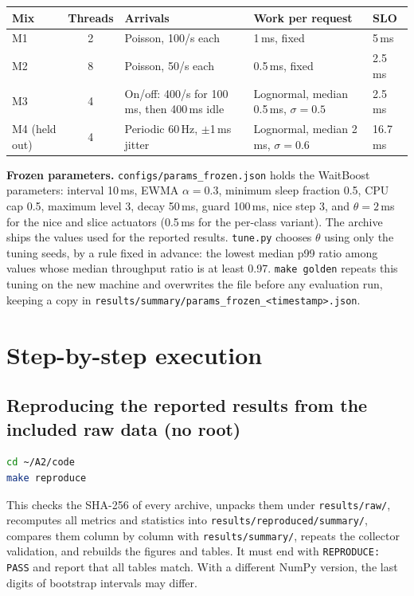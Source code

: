 \documentclass[10.5pt,a4paper]{article}
\newcommand{\f}[1]{\texttt{#1}}
\begin{document}
\begin{center}
\begin{tabularx}{\textwidth}{@{}l c L L l@{}}
\toprule
\textbf{Mix} & \textbf{Threads} & \textbf{Arrivals} & \textbf{Work per request} & \textbf{SLO} \\
\midrule
M1 & 2 & Poisson, 100/s each & 1\,ms, fixed & 5\,ms \\
M2 & 8 & Poisson, 50/s each & 0.5\,ms, fixed & 2.5\,ms \\
M3 & 4 & On/off: 400/s for 100\,ms, then 400\,ms idle & Lognormal, median 0.5\,ms, $\sigma=0.5$ & 2.5\,ms \\
M4 (held out) & 4 & Periodic 60\,Hz, $\pm$1\,ms jitter & Lognormal, median 2\,ms, $\sigma=0.6$ & 16.7\,ms \\
\bottomrule
\end{tabularx}
\end{center}

\textbf{Frozen parameters.} \f{configs/params\_frozen.json} holds the WaitBoost parameters: interval 10\,ms, EWMA $\alpha=0.3$, minimum sleep fraction 0.5, CPU cap 0.5, maximum level 3, decay 50\,ms, guard 100\,ms, nice step 3, and $\theta=2$\,ms for the nice and slice actuators (0.5\,ms for the per-class variant). The archive ships the values used for the reported results. \f{tune.py} chooses $\theta$ using only the tuning seeds, by a rule fixed in advance: the lowest median p99 ratio among values whose median throughput ratio is at least 0.97. \f{make golden} repeats this tuning on the new machine and overwrites the file before any evaluation run, keeping a copy in \f{results/summary/params\_frozen\_<timestamp>.json}.

\section{Step-by-step execution}

\subsection{Reproducing the reported results from the included raw data (no root)}\label{sec:from-raw}
\begin{lstlisting}[language=bash]
cd ~/A2/code
make reproduce
\end{lstlisting}
This checks the SHA-256 of every archive, unpacks them under \f{results/raw/}, recomputes all metrics and statistics into \f{results/reproduced/summary/}, compares them column by column with \f{results/summary/}, repeats the collector validation, and rebuilds the figures and tables. It must end with \f{REPRODUCE: PASS} and report that all tables match. With a different NumPy version, the last digits of bootstrap intervals may differ.
\end{document}
